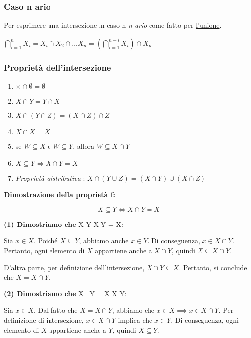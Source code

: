 \documentclass[article,12pt]{book}
\begin{document}
\begin{enumerate}
\subsubsection{Caso n ario}
Per esprimere una intersezione in caso n \textit{n ario} come fatto per \hyperref[unione ennaria]{l'unione}.
\begin{center}
    \(\bigcap_{i=1}^{n}X_{i}=X_{i}\cap X_2\cap\ldots X_{n}=\left(\bigcap_{i=1}^{n-i}X_{i}\right)\cap X_{n}\)
\end{center}

\subsubsection{Proprietà dell'intersezione}
\begin{enumerate}
    \item \(\times\cap\emptyset=\emptyset \)
    \item \(X \cap Y = Y \cap X\)
    \item \(X \cap (Y \cap Z) = (X \cap Z) \cap Z \)
    \item \(X \cap X = X\)
    \item se $W \subseteq X$ e $W \subseteq Y$, allora $W \subseteq X \cap Y$
    \item $X \subseteq Y \iff X \cap Y = X$
    \item \textit{Proprietà distributiva} : $X \cap (Y \cup Z) = (X \cap Y) \cup (X \cap Z)$
    \end{enumerate}


\textbf{Dimostrazione della proprietà f:}

\[
X \subseteq Y \iff X \cap Y = X
\]

\textbf{(1) Dimostriamo che } X \subseteq Y \implies X \cap Y = X:

Sia \( x \in X \). Poiché \( X \subseteq Y \), abbiamo anche \( x \in Y \). Di conseguenza, \( x \in X \cap Y \). Pertanto, ogni elemento di \( X \) appartiene anche a \( X \cap Y \), quindi \( X \subseteq X \cap Y \).

D'altra parte, per definizione dell'intersezione, \( X \cap Y \subseteq X \). Pertanto, si conclude che \( X = X \cap Y \).

\textbf{(2) Dimostriamo che } X \cap \ Y = X \implies X \subseteq Y:

Sia \( x \in X \). Dal fatto che \( X = X \cap Y \), abbiamo che \( x \in X \implies x \in X \cap Y \). Per definizione di intersezione, \( x \in X \cap Y \) implica che \( x \in Y \). Di conseguenza, ogni elemento di \( X \) appartiene anche a \( Y \), quindi \( X \subseteq Y \).


\end{enumerate}
\end{document}
